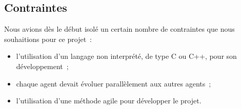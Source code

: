         \subsection{Contraintes}
        Nous avions dès le début isolé un certain nombre de contraintes que nous souhaitions pour ce projet~:
        \begin{itemize}
          \item l'utilisation d'un langage non interprété, de type C ou C++, pour son développement~;
		  \item chaque agent devait évoluer parallèlement aux autres agents~;
          \item l'utilisation d'une méthode agile pour développer le projet.
        \end{itemize}

